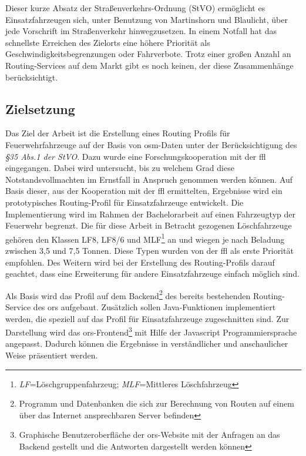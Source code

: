 \vspace{1.2cm}

Dieser kurze Absatz der Straßenverkehrs-Ordnung (StVO) ermöglicht es Einsatzfahrzeugen sich, unter Benutzung von Martinshorn und Blaulicht, über jede Vorschrift im Straßenverkehr hinwegzusetzen.
In einem Notfall hat das schnellste Erreichen des Zielorts eine höhere Priorität als Geschwindigkeitsbegrenzungen oder Fahrverbote.
Trotz einer großen Anzahl an Routing-Services auf dem Markt gibt es noch keinen, der diese Zusammenhänge berücksichtigt.

\subsection{Zielsetzung}
Das Ziel der Arbeit ist die Erstellung eines Routing Profils für Feuerwehrfahrzeuge auf der Basis von \gls{osm}-Daten unter der Berücksichtigung des \textit{§35 Abs.1 der StVO}. Dazu wurde eine Forschungskooperation mit der \gls{ffl} eingegangen. Dabei wird untersucht, bis zu welchem Grad diese Notstandsvollmachten im Ernstfall in Anspruch genommen werden können.
Auf Basis dieser, aus der Kooperation mit der \gls{ffl} ermittelten, Ergebnisse wird ein prototypisches Routing-Profil für Einsatzfahrzeuge entwickelt.
Die Implementierung wird im Rahmen der Bachelorarbeit auf einen Fahrzeugtyp der Feuerwehr begrenzt.
Die für diese Arbeit in Betracht gezogenen Löschfahrzeuge gehören den Klassen LF8, LF8/6 und MLF\footnote{\textit{LF}=Löschgruppenfahrzeug; \textit{MLF}=Mittleres Löschfahrzeug} an und wiegen je nach Beladung zwischen 3,5 und 7,5 Tonnen.
Diese Typen wurden von der \gls{ffl} als erste Priorität empfohlen.
Des Weitern wird bei der Erstellung des Routing-Profils darauf geachtet, dass eine Erweiterung für andere Einsatzfahrzeuge einfach möglich sind.
\vspace{0.5cm}

Als Basis wird das Profil auf dem Backend\footnote{Programm und Datenbanken die sich zur Berechnung von Routen auf einem über das Internet ansprechbaren Server befinden} des bereits bestehenden Routing-Service des \gls{ors} aufgebaut.
Zusätzlich sollen Java-Funktionen implementiert werden, die speziell auf das Profil für Einsatzfahrzeuge zugeschnitten sind.
Zur Darstellung wird das \gls{ors}-Frontend\footnote{Graphische Benutzeroberfläche der \gls{ors}-Website mit der Anfragen an das Backend gestellt und die Antworten dargestellt werden können} mit Hilfe der Javascript Programmiersprache angepasst.
Dadurch können die Ergebnisse in verständlicher und anschaulicher Weise präsentiert werden.
